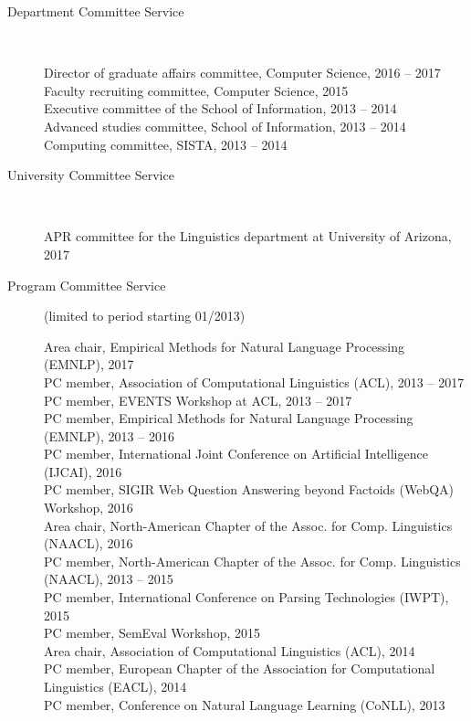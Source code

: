 \documentclass[10pt]{article}
\newcommand{\lmt}{(limited to period starting 01/2013)}
\begin{document}
\begin{description}
\vspace{-.3cm}\item [Department Committee Service]\

Director of graduate affairs committee, Computer Science, 2016 -- 2017\\
Faculty recruiting committee, Computer Science, 2015\\
Executive committee of the School of Information, 2013 -- 2014\\
Advanced studies committee, School of Information, 2013 -- 2014\\
Computing committee, SISTA, 2013 -- 2014\\

\vspace{-.3cm}\item [University Committee Service]\

APR committee for the Linguistics department at University of Arizona, 2017 \\

\vspace{-.3cm}\item [Program Committee Service] \lmt \

Area chair, Empirical Methods for Natural Language Processing (EMNLP), 2017 \\
PC member, Association of Computational Linguistics (ACL), 2013 -- 2017\\
PC member, EVENTS Workshop at ACL, 2013 -- 2017\\
PC member, Empirical Methods for Natural Language Processing (EMNLP), 2013 -- 2016 \\
PC member, International Joint Conference on Artificial Intelligence (IJCAI), 2016\\
PC member, SIGIR Web Question Answering beyond Factoids (WebQA) Workshop, 2016 \\
Area chair, North-American Chapter of the Assoc. for Comp. Linguistics (NAACL), 2016 \\
PC member, North-American Chapter of the Assoc. for Comp. Linguistics (NAACL), 2013 -- 2015\\
PC member, International Conference on Parsing Technologies (IWPT), 2015\\
PC member, SemEval Workshop, 2015 \\
Area chair, Association of Computational Linguistics (ACL), 2014\\
PC member, European Chapter of the Association for Computational Linguistics (EACL), 2014 \\
PC member, Conference on Natural Language Learning (CoNLL), 2013 \\


\end{description}
\end{document}
